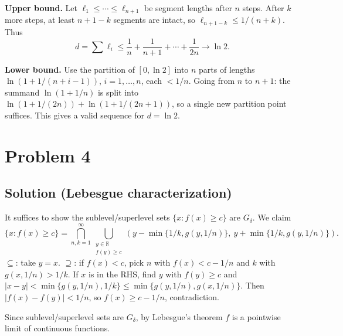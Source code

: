 \documentclass{article}
\begin{document}
\textbf{Upper bound.} Let $\ell_1 \leq \cdots \leq \ell_{n+1}$ be segment lengths after $n$ steps. After $k$ more steps, at least $n+1-k$ segments are intact, so $\ell_{n+1-k} \leq 1/(n+k)$. Thus
\[ d = \sum \ell_i \leq \frac{1}{n} + \frac{1}{n+1} + \cdots + \frac{1}{2n} \to \ln 2. \]

\textbf{Lower bound.} Use the partition of $[0, \ln 2]$ into $n$ parts of lengths $\ln(1 + 1/(n+i-1))$, $i = 1, \ldots, n$, each $< 1/n$. Going from $n$ to $n+1$: the summand $\ln(1 + 1/n)$ is split into $\ln(1 + 1/(2n)) + \ln(1 + 1/(2n+1))$, so a single new partition point suffices. This gives a valid sequence for $d = \ln 2$.

\section*{Problem 4}
\subsection*{Solution (Lebesgue characterization)}
It suffices to show the sublevel/superlevel sets $\{x : f(x) \geq c\}$ are $G_\delta$. We claim
\[ \{x : f(x) \geq c\} = \bigcap_{n,k=1}^\infty \bigcup_{\substack{y \in \mathbb{R} \\ f(y) \geq c}} \left(y - \min\{1/k, g(y, 1/n)\},\ y + \min\{1/k, g(y, 1/n)\}\right). \]
$\subseteq$: take $y = x$. $\supseteq$: if $f(x) < c$, pick $n$ with $f(x) < c - 1/n$ and $k$ with $g(x, 1/n) > 1/k$. If $x$ is in the RHS, find $y$ with $f(y) \geq c$ and $|x - y| < \min\{g(y, 1/n), 1/k\} \leq \min\{g(y, 1/n), g(x, 1/n)\}$. Then $|f(x) - f(y)| < 1/n$, so $f(x) \geq c - 1/n$, contradiction.

Since sublevel/superlevel sets are $G_\delta$, by Lebesgue's theorem $f$ is a pointwise limit of continuous functions.
\end{document}
